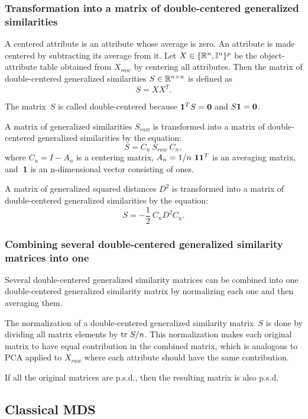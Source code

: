 \documentclass[10pt,a4paper]{article}
\begin{document}
\subsubsection {Transformation into a matrix of double-centered generalized similarities}

A centered attribute is an attribute whose average is zero.
An attribute is made centered by subtracting its average from it.
Let $X \in \{\mathbb R^n,\mathbb I^n\}^p$ be the object-attribute table obtained from $X_{raw}$ by centering all attributes.
Then the matrix of double-centered generalized similarities $S \in \mathbb R^{n \times n}$ is defined as
$$ S = X X^T. $$

The matrix~$S$ is called double-centered because $\mathbf 1^TS = \mathbf 0$ and $S \mathbf 1 = \mathbf 0$.

A matrix of generalized similarities $S_{raw}$ is transformed into a matrix of double-centered generalized similarities by the equation:
$$ S = C_n \ S_{raw} \ C_n, $$
where $C_n = I - A_n$ is a centering matrix,
$A_n = 1/n \ \mathbf 1 \mathbf 1^T$ is an averaging matrix,
and~$\mathbf 1$ is an n-dimensional vector consisting of ones.

A matrix of generalized squared distances $D^2$ is transformed into a matrix of double-centered generalized similarities by the equation:
$$ S = - \frac 1 2 \ C_n D^2 C_n. $$


\subsubsection {Combining several double-centered generalized similarity matrices into one}

Several double-centered generalized similarity matrices can be combined into one double-centered generalized similarity matrix by normalizing each one and then averaging them.

The normalization of a double-centered generalized similarity matrix~$S$ is done by dividing all matrix elements by $\mathrm {tr} \  S/n$.
This normalization makes each original matrix to have equal contribution in the combined matrix,
which is analogous to PCA applied to $X_{raw}$ where each attribute should have the same contribution.

If all the original matrices are p.s.d., then the resulting matrix is also p.s.d.


\subsection {Classical MDS}
\end{document}
